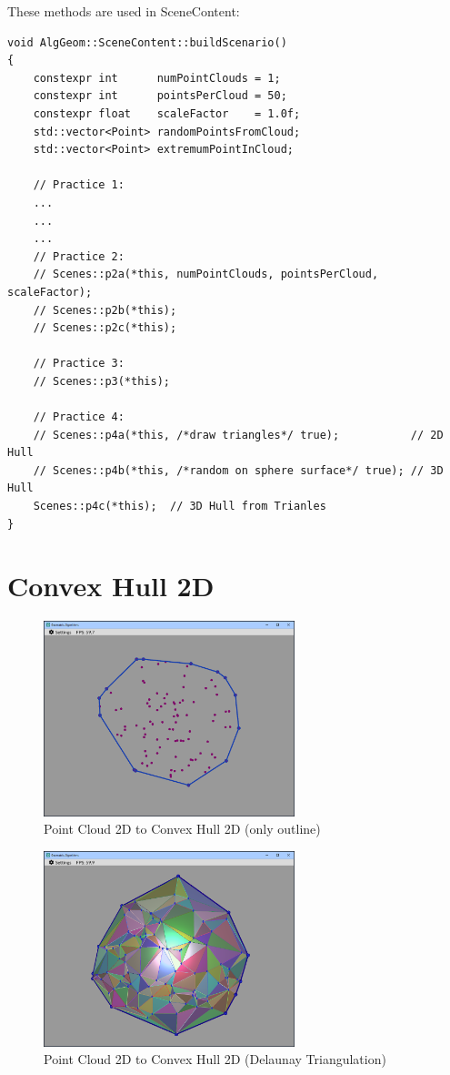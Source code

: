 \documentclass[12pt,a4paper,english]{article}
\begin{document}
These methods are used in SceneContent:

\begin{verbatim}
void AlgGeom::SceneContent::buildScenario()
{
    constexpr int      numPointClouds = 1;
    constexpr int      pointsPerCloud = 50;
    constexpr float    scaleFactor    = 1.0f;
    std::vector<Point> randomPointsFromCloud;
    std::vector<Point> extremumPointInCloud;

    // Practice 1:
    ...
    ...
    ...
    // Practice 2:
    // Scenes::p2a(*this, numPointClouds, pointsPerCloud, scaleFactor);
    // Scenes::p2b(*this);
    // Scenes::p2c(*this);

    // Practice 3:
    // Scenes::p3(*this);

    // Practice 4:
    // Scenes::p4a(*this, /*draw triangles*/ true);           // 2D Hull
    // Scenes::p4b(*this, /*random on sphere surface*/ true); // 3D Hull
    Scenes::p4c(*this);  // 3D Hull from Trianles
}
\end{verbatim}

\newpage

\section{Convex Hull 2D}

\begin{figure}[H]
    \centering
    \includegraphics[width=0.65\textwidth]{p4-1-a}
    \caption[]{Point Cloud 2D to Convex Hull 2D (only outline)}
    \label{fig:p4-1-a}
\end{figure}

\begin{figure}[H]
    \centering
    \includegraphics[width=0.65\textwidth]{p4-1-b}
    \caption[]{Point Cloud 2D to Convex Hull 2D (Delaunay Triangulation)}
    \label{fig:p4-1-b}
\end{figure}
\end{document}
